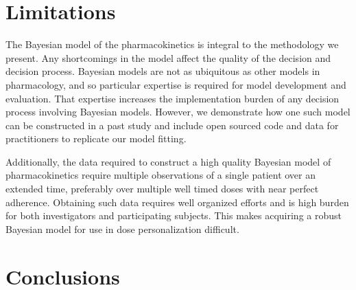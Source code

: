 \section{Limitations}


The Bayesian model of the pharmacokinetics is integral to the methodology we present.  Any shortcomings in the model affect the quality of the decision and decision process.  Bayesian models are not as ubiquitous as other models in pharmacology, and so particular expertise is required for model development and evaluation.  That expertise increases the implementation burden of any decision process involving Bayesian models.  However, we demonstrate how one such model can be constructed in a past study \cite{pananos2020comparisons} and include open sourced code and data for practitioners to replicate our model fitting.

Additionally, the data required to construct a high quality Bayesian model of pharmacokinetics require multiple observations of a single patient over an extended time, preferably over multiple well timed doses with near perfect adherence.  Obtaining such data requires well organized efforts and is high burden for both investigators and participating subjects.  This makes acquiring a robust Bayesian model for use in dose personalization difficult.

\section{Conclusions}\label{ss:discussion}



